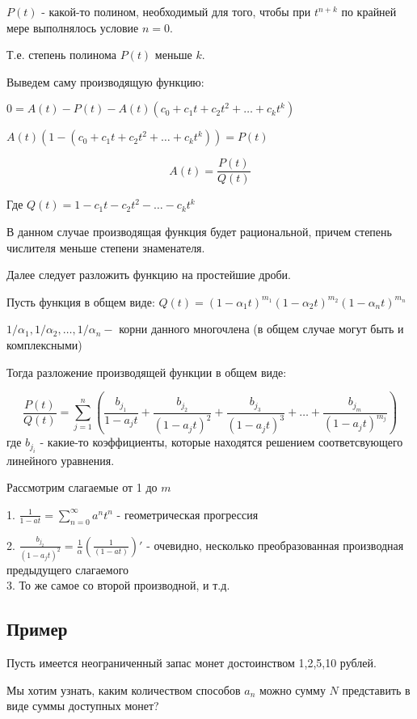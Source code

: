 $ P(t) $ - какой-то полином, необходимый для того, чтобы при $ t^{n+k} $
по крайней мере выполнялось условие $ n =0 $.

Т.е. степень полинома $ P(t) $ меньше $ k $.

Выведем саму производящую функцию:

$0 = A(t) - P(t) - A(t)(c_0 + c_1 t + c_2 t^2 + \ldots + c_k t^k)$

$A(t)(1 - (c_0 + c_1 t + c_2 t^2 + \ldots + c_k t^k) ) = P(t)$

$$
A(t) = \dfrac{P(t)}{Q(t)}
$$

Где $Q(t) = 1 - c_1 t - c_2 t^2 - \ldots - c_k t^k$

В данном случае производящая функция будет рациональной, причем
степень числителя меньше степени знаменателя.

Далее следует разложить функцию на простейшие дроби.

Пусть функция в общем виде:
$Q(t) = (1 - \alpha_1 t)^{m_1} (1 - \alpha_2 t)^{m_2} (1 - \alpha_n t)^{m_n}$

$1/\alpha_1, 1/\alpha_2, \ldots, 1/\alpha_n - $ корни данного многочлена 
(в общем случае могут быть и комплексными)

Тогда разложение производящей функции в общем виде:

$$
\frac{P(t)}{Q(t)} = \sum\limits_{j=1}^{n} 
\left(
\frac{b_{j_1}}{1-a_j t} 
+ \frac{b_{j_2}}{(1-a_j t)^{2}} 
+ \frac{b_{j_3}}{(1-a_j t)^{3}}
+ \ldots 
+ \frac{b_{j_m}}{(1-a_j t)^{m_j}}
\right)
$$
где $ b_{j_i} $ - какие-то коэффициенты, 
которые находятся решением соответсвующего линейного уравнения.

Рассмотрим слагаемые от 1 до $ m $

1. $ \frac{1}{1-a t} = \sum\limits_{n=0}^{\infty} {a}^{n} {t}^{n}$ - геометрическая прогрессия 

2. $ \frac{b_{j_2}}{(1-a_j t)^{2}} = \frac{1}{\alpha} \left( \frac{1}{(1-a t)} \right)' $ - очевидно, несколько преобразованная производная предыдущего слагаемого\\

3. То же самое со второй производной, и т.д.

\subsection{Пример}

Пусть имеется неограниченный запас монет достоинством 1,2,5,10 рублей.

Мы хотим узнать, каким количеством способов $ a_n $ можно сумму $ N $
представить в виде суммы доступных монет?

